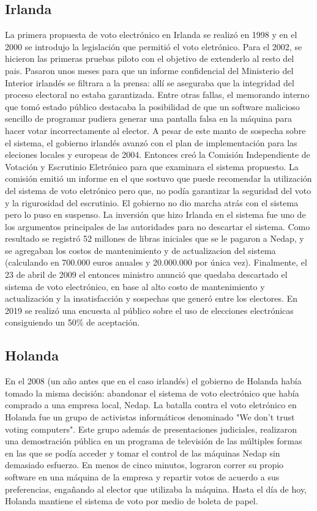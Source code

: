 \subsection{Irlanda}
La primera propuesta de voto electrónico en Irlanda se realizó en 1998 y en el 2000 se introdujo la legislación que permitió el voto eletrónico. Para el 2002, se hicieron las primeras pruebas piloto con el objetivo de extenderlo al resto del pais. Pasaron unos meses para que un informe confidencial del Ministerio del Interior irlandés se filtrara a la prensa: allí se aseguraba que la integridad del proceso electoral no estaba garantizada. Entre otras fallas, el memorando interno que tomó estado público destacaba la posibilidad de que un software malicioso sencillo de programar pudiera generar una pantalla falsa en la máquina para hacer votar incorrectamente al elector. A pesar de este manto de sospecha sobre el sistema, el gobierno irlandés avanzó con el plan de implementación para las eleciones locales y europeas de 2004. Entonces creó la Comisión Independiente de Votación y Escrutinio Eletrónico para que examinara el sistema propuesto. La comisión emitió un informe en el que sostuvo que puede recomendar la utilización del sistema de voto eletrónico pero que, no podía garantizar la seguridad del voto y la rigurosidad del escrutinio. El gobierno no dio marcha atrás con el sistema pero lo puso en suspenso. La inversión que hizo Irlanda en el sistema fue uno de los argumentos principales de las autoridades para no descartar el sistema. Como resultado se registró 52 millones de libras iniciales que se le pagaron a Nedap, y se agregaban los costos de mantenimiento y de actualizacion del sistema (calculando en 700.000 euros anuales y 20.000.000 por única vez).\newline
Finalmente, el 23 de abril de 2009 el entonces ministro anunció que quedaba descartado el sistema de voto electrónico, en base al alto costo de mantenimiento y actualización y la insatisfacción y sospechas que generó entre los electores. En 2019 se realizó una encuesta al público sobre el uso de elecciones electrónicas consiguiendo un 50\% de aceptación. \cite{eleccionesIrlanda}
\subsection{Holanda}
En el 2008 (un año antes que en el caso irlandés) el gobierno de Holanda había tomado la misma decisión: abandonar el sistema de voto electrónico que había comprado a una empresa local, Nedap. La batalla contra el voto eletrónico en Holanda fue un grupo de activistas informáticos denominado "We don't trust voting computers". Este grupo además de presentaciones judiciales, realizaron una demostración pública en un programa de televisión de las múltiples formas en las que se podía acceder y tomar el control de las máquinas Nedap sin demasiado esfuerzo. En menos de cinco minutos, lograron correr su propio software en una máquina de la empresa y repartir votos de acuerdo a sus preferencias, engañando al elector que utilizaba la máquina. Hasta el día de hoy, Holanda mantiene el sistema de voto por medio de boleta de papel.\cite{netherlands}

